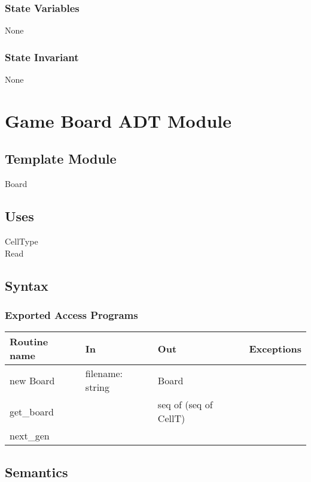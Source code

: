 \documentclass[12pt]{article}
\begin{document}
\subsubsection* {State Variables}

None

\subsubsection* {State Invariant}

None

\newpage

\section* {Game Board ADT Module}

\subsection*{Template Module}

Board

\subsection* {Uses}

\noindent CellType\\
\noindent Read

\subsection* {Syntax}

\subsubsection* {Exported Access Programs}

\begin{tabular}{| l | l | l | l |}
\hline
\textbf{Routine name} & \textbf{In} & \textbf{Out} & \textbf{Exceptions}\\
\hline
new Board  & filename: string & Board &\\
\hline
get\_board &  & seq of (seq of CellT) & \\
\hline
next\_gen & & &\\

\hline
\end{tabular}

\subsection* {Semantics}
\end{document}
